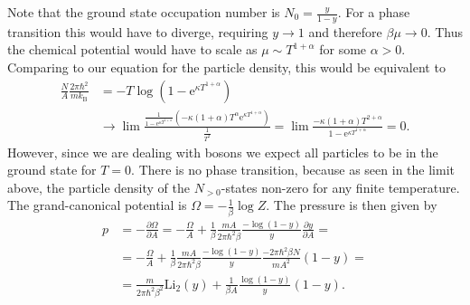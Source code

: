\documentclass[english, parskip=full]{scrartcl}
\newcommand{\kla}{}
\newcommand{\tecxt}{}
\newcommand{\e}{\text{e}}
\begin{document}
Note that the ground state occupation number is $N_0 = \frac{y}{1 - y}$.
For a phase transition this would have to diverge, requiring $y\rightarrow 1$ and therefore $\beta\mu \rightarrow 0$.
Thus the chemical potential would have to scale as $\mu \sim T^{1+\alpha}$ for some $\alpha > 0$.
Comparing to our equation for the particle density, this would be equivalent to
\begin{align}
\frac{N}{A} \frac{2\pi\hbar^2}{mk_\tecxt\text{B}} &= -T \log \kla\left( 1 - \e^{\kappa T^{1 + \alpha}} \right) \\
&\rightarrow \lim \frac{\frac{1}{1 - \e^{\kappa T^{1+\alpha}}} \kla\left( -\kappa (1+\alpha) T^\alpha \e^{\kappa T^{1+\alpha}} \right)}{\frac{1}{T^2}} = \lim \frac{-\kappa (1+\alpha) T^{2+\alpha}}{1 - \e^{\kappa T^{1+\alpha}}} = 0.
\end{align}
However, since we are dealing with bosons we expect all particles to be in the ground state for $T=0$.
There is no phase transition, because as seen in the limit above, the particle density of the $N_{>0}$-states non-zero for any finite temperature.
The grand-canonical potential is $\Omega = -\frac{1}{\beta} \log Z$.
The pressure is then given by
\begin{align}
p &= -\frac{\partial \Omega}{\partial A} = -\frac{\Omega}{A} + \frac{1}{\beta} \frac{mA}{2\pi\hbar^2\beta} \frac{-\log (1-y)}{y} \frac{\partial y}{\partial A} = \\
&= -\frac{\Omega}{A} + \frac{1}{\beta} \frac{mA}{2\pi\hbar^2\beta} \frac{-\log (1-y)}{y} \frac{-2\pi\hbar^2\beta N}{mA^2} (1 - y) = \\
&= \frac{m}{2\pi\hbar^2\beta^2} \tecxt\text{Li}_2(y) + \frac{1}{\beta A} \frac{\log (1-y)}{y}(1-y).
\end{align}
\end{document}
